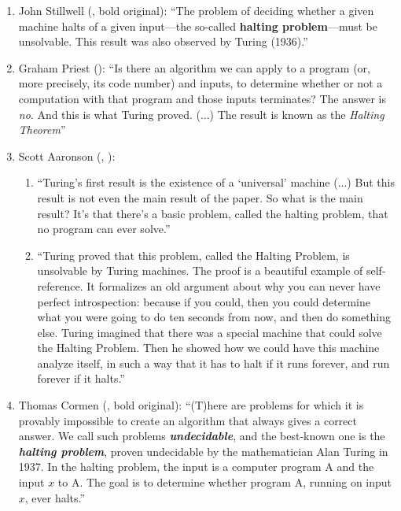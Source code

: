 \documentclass[12pt]{amsart}
\begin{document}
\begin{enumerate}\small

    \item John Stillwell (\cite[p. 370]{stillwell2022story}, bold original): \enquote{The problem of deciding whether a given machine halts of a given input---the so-called \textbf{halting problem}---must be unsolvable. This result was also observed by Turing (1936).}

    \bigskip

     \item Graham Priest (\cite[pp. 105-107]{priest2017logic}): \enquote{Is there an algorithm we can apply to a program (or, more precisely, its code number) and inputs, to determine whether or not a computation with that program and those inputs terminates? The answer is \textit{no}. And this is what Turing proved. (...) The result is known as the \textit{Halting Theorem}}\goodbreak

    \bigskip

      \item Scott Aaronson (\cite[p. 21]{aaronson2013quantum}, \cite{aaronson1999can}): 

      \bigskip 
      
      \begin{enumerate}

          \item \enquote{Turing's first result is the existence of a \enquote{universal} machine (...) But this result is not even the main result of the paper. So what is the main result? It's that there's a basic problem, called the halting problem, that no program can ever solve.}

          \bigskip 
          \item \enquote{Turing proved that this problem, called the Halting Problem, is unsolvable by Turing machines. The proof is a beautiful example of self-reference. It formalizes an old argument about why you can never have perfect introspection: because if you could, then you could determine what you were going to do ten seconds from now, and then do something else. Turing imagined that there was a special machine that could solve the Halting Problem. Then he showed how we could have this machine analyze itself, in such a way that it has to halt if it runs forever, and run forever if it halts.} 
      \end{enumerate}

    \bigskip 

    \item Thomas Cormen (\cite[p. 210]{cormen2013algorithms}, bold original): \enquote{(T)here are problems for which it is provably impossible to create an algorithm that always gives a correct answer. We call such problems \textit{\textbf{undecidable}}, and the best-known one is the \textit{\textbf{halting problem}}, proven undecidable by the mathematician Alan Turing in 1937. In the halting problem, the input is a computer program A and the input $x$ to A. The goal is to determine whether program A, running on input $x$, ever halts.}


\end{enumerate}
\end{document}
